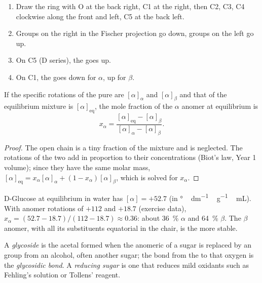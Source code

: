 \begin{method}\label{met:b2:biomolecules:haworth}
\begin{enumerate}
  \item Draw the ring with O at the back right, C1 at the right, then C2, C3, C4 clockwise along the
        front and left, C5 at the back left.
  \item Groups on the right in the Fischer projection go down, groups on the left go up.
  \item On C5 (D series), the  goes up.
  \item On C1, the  goes down for $\alpha$, up for $\beta$.
\end{enumerate}
\end{method}

\begin{proposition}\label{prop:b2:biomolecules:mutarotation}
If the specific rotations of the pure  are $[\alpha]_\alpha$ and $[\alpha]_\beta$ and that of the
equilibrium mixture is $[\alpha]_{\mathrm{eq}}$, the mole fraction of the $\alpha$ anomer at
equilibrium is
\begin{equation*}
x_\alpha = \frac{[\alpha]_{\mathrm{eq}} - [\alpha]_\beta}{[\alpha]_\alpha - [\alpha]_\beta}.
\end{equation*}
\end{proposition}

\begin{proof}
The open chain is a tiny fraction of the mixture and is neglected. The rotations of the two 
add in proportion to their concentrations (Biot's law, Year 1 volume); since they have the same molar
mass, $[\alpha]_{\mathrm{eq}} = x_\alpha[\alpha]_\alpha + (1 - x_\alpha)[\alpha]_\beta$, which is solved
for $x_\alpha$.
\end{proof}

D-Glucose at equilibrium in water has $[\alpha] = +52.7$ (in \unit{\degree\,dm^{-1}\,g^{-1}\,mL}).
With anomer rotations of $+112$ and $+18.7$ (exercise data), $x_\alpha = (52.7 - 18.7)/(112 - 18.7)
\approx 0.36$: about 36~\% $\alpha$ and 64~\% $\beta$. The $\beta$ anomer, with all its
substituents equatorial in the chair, is the more stable.

\begin{definition}[Glycosides]\label{def:b2:biomolecules:glycoside}
A \emph{glycoside} is the acetal formed when the anomeric  of a sugar is replaced
by an  group from an alcohol, often another sugar; the bond from the  to that
oxygen is the \emph{glycosidic bond}. A \emph{reducing sugar} is one that reduces mild oxidants such as Fehling's solution or Tollens' reagent.
\end{definition}

